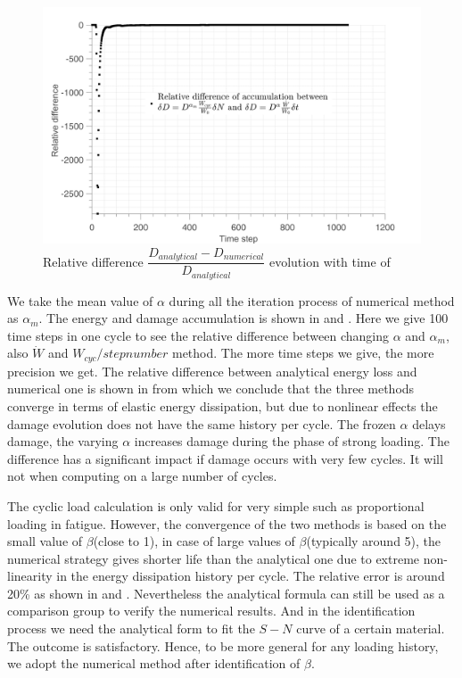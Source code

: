 \begin{figure}[!h]
\centering
\includegraphics[width=\textwidth]{figures//D_3methods_diff_100steps.png} 
\caption{Relative difference $\dfrac{D_{analytical}-D_{numerical}}{D_{analytical}}$ evolution with time of }
\label{Damagediff}
\end{figure}
We take the mean value of $\alpha$ during all the iteration process of numerical method as $\alpha_{m}$. The energy and damage accumulation is shown in  and . Here we give 100 time steps in one cycle to see the relative difference between changing $\alpha$ and $\alpha_{m}$, also $\dot{W}$ and $W_{cyc}/stepnumber$  method. The more time steps we give, the more precision we get. The relative difference between analytical energy loss and numerical one is shown in  from which we conclude that the three methods converge in terms of elastic energy dissipation, but due to nonlinear effects the damage evolution does not have the same history per cycle. The frozen $\alpha$ delays damage, the varying $\alpha$ increases damage during the phase of strong loading. The difference has a significant impact if damage occurs with very few cycles. It will not when computing on a large number of cycles.

The cyclic load calculation is only valid for very simple such as proportional loading in fatigue. However, the convergence of the two methods is based on the small value of $\beta$(close to 1), in case of large values of $\beta$(typically around 5), the numerical strategy gives shorter life than the analytical one due to extreme non-linearity in the energy dissipation history per cycle. The relative error is around 20\% as shown in  and . Nevertheless the analytical formula can still be used as a comparison group to verify the numerical results. And in the identification process we need the analytical form to fit the $S-N$ curve of a certain material. The outcome is satisfactory. Hence, to be more general for any loading history, we adopt the numerical method after identification of $\beta$. 

